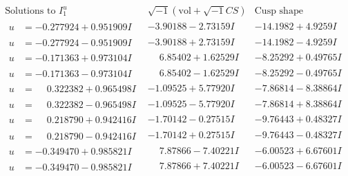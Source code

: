 \documentclass[1p]{elsarticle_modified}
\theoremstyle{definition}
\newcommand{\I}{\sqrt{-1}}
\begin{document}
$$\begin{array}{c|c|c}  
\text{Solutions to }I^u_{1}& \I (\text{vol} + \sqrt{-1}CS) & \text{Cusp shape}\\
 \hline 
\begin{aligned}
u &= -0.277924 + 0.951909 I\end{aligned}
 & -3.90188 - 2.73159 I & -14.1982 + 4.9259 I \\ \hline\begin{aligned}
u &= -0.277924 - 0.951909 I\end{aligned}
 & -3.90188 + 2.73159 I & -14.1982 - 4.9259 I \\ \hline\begin{aligned}
u &= -0.171363 + 0.973104 I\end{aligned}
 & \phantom{-}6.85402 + 1.62529 I & -8.25292 + 0.49765 I \\ \hline\begin{aligned}
u &= -0.171363 - 0.973104 I\end{aligned}
 & \phantom{-}6.85402 - 1.62529 I & -8.25292 - 0.49765 I \\ \hline\begin{aligned}
u &= \phantom{-}0.322382 + 0.965498 I\end{aligned}
 & -1.09525 + 5.77920 I & -7.86814 - 8.38864 I \\ \hline\begin{aligned}
u &= \phantom{-}0.322382 - 0.965498 I\end{aligned}
 & -1.09525 - 5.77920 I & -7.86814 + 8.38864 I \\ \hline\begin{aligned}
u &= \phantom{-}0.218790 + 0.942416 I\end{aligned}
 & -1.70142 - 0.27515 I & -9.76443 + 0.48327 I \\ \hline\begin{aligned}
u &= \phantom{-}0.218790 - 0.942416 I\end{aligned}
 & -1.70142 + 0.27515 I & -9.76443 - 0.48327 I \\ \hline\begin{aligned}
u &= -0.349470 + 0.985821 I\end{aligned}
 & \phantom{-}7.87866 - 7.40221 I & -6.00523 + 6.67601 I \\ \hline\begin{aligned}
u &= -0.349470 - 0.985821 I\end{aligned}
 & \phantom{-}7.87866 + 7.40221 I & -6.00523 - 6.67601 I \\ \hline\begin{aligned}

\end{aligned}
\end{array}$$
\end{document}
